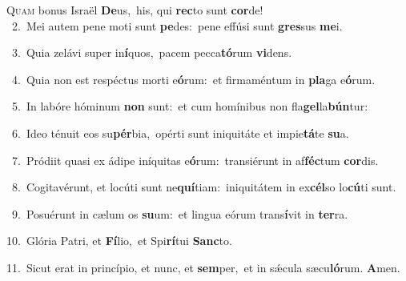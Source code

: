 \lettrine{\initial\textcolor{\initialcolor}{Q}}{uam} bonus Israël \textbf{De}\-us,~\star his, qui \textbf{rec}\-to sunt \textbf{cor}\-de!\\
{\numbfont\textcolor{\numbcolor}{~2.}}~Mei autem pene moti sunt \textbf{pe}\-des:~\star pene effúsi sunt \textbf{gres}\-sus \textbf{me}\-i.\par
{\numbfont\textcolor{\numbcolor}{~3.}}~Quia zelávi super in\-\textbf{í}\-quos,~\star pacem pecca\-\textbf{tó}\-rum \textbf{vi}\-dens.\par
{\numbfont\textcolor{\numbcolor}{~4.}}~Quia non est respéctus morti e\-\textbf{ó}\-rum:~\star et firmaméntum in \textbf{pla}\-ga e\-\textbf{ó}\-rum.\par
{\numbfont\textcolor{\numbcolor}{~5.}}~In labóre hóminum \textbf{non} sunt:~\star et cum homínibus non fla\-\textbf{gel}\-la\-\textbf{bún}\-tur:\par
{\numbfont\textcolor{\numbcolor}{~6.}}~Ideo ténuit eos su\-\textbf{pér}\-bia,~\star opérti sunt iniquitáte et impie\-\textbf{tá}\-te \textbf{su}\-a.\par
{\numbfont\textcolor{\numbcolor}{~7.}}~Pródiit quasi ex ádipe iníquitas e\-\textbf{ó}\-rum:~\star transiérunt in af\-\textbf{féc}\-tum \textbf{cor}\-dis.\par
{\numbfont\textcolor{\numbcolor}{~8.}}~Cogitavérunt, et locúti sunt ne\-\textbf{quí}\-tiam:~\star iniquitátem in ex\-\textbf{cél}\-so lo\-\textbf{cú}\-ti sunt.\par
{\numbfont\textcolor{\numbcolor}{~9.}}~Posuérunt in cælum os \textbf{su}\-um:~\star et lingua eórum trans\-\textbf{í}\-vit in \textbf{ter}\-ra.\par
{\numbfont\textcolor{\numbcolor}{10.}}~Glória Patri, et \textbf{Fí}\-lio,~\star et Spi\-\textbf{rí}\-tui \textbf{Sanc}\-to.\par
{\numbfont\textcolor{\numbcolor}{11.}}~Sicut erat in princípio, et nunc, et \textbf{sem}\-per,~\star et in sǽcula sæcu\-\textbf{ló}\-rum. \textbf{A}\-men.\par

